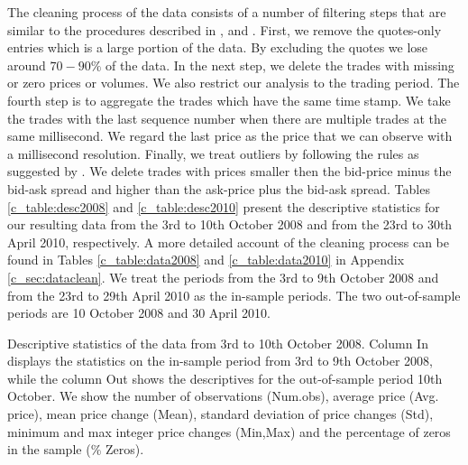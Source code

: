 \documentclass[12pt]{article}
\begin{document}
The cleaning process of the data consists of a number of filtering steps that are
similar to the procedures described in \citet{BoudtCornelissenPayseur},
\citet{BNHansenLundeShephard2008} and  \citet{BrownleesGallo2006}.
First, we remove the quotes-only entries which is a large portion of the data.
By excluding the quotes we lose around $70-90\%$ of the data.
In the next step, we delete the trades with missing or zero prices or volumes.
We also restrict our analysis to the trading period.
The fourth step is to aggregate the trades which have
the same time stamp. We take the trades with the last
sequence number when there are multiple trades at the same millisecond.
We regard the last price as the price that
we can observe with a millisecond resolution.
Finally, we treat outliers by following the rules as suggested by
\citet{BNHansenLundeShephard2008}.
We delete trades with prices smaller then the bid-price minus the bid-ask spread
and higher than the ask-price plus the bid-ask spread. 
Tables \ref{c_table:desc2008} and \ref{c_table:desc2010}
present the descriptive statistics for our resulting data from
the 3rd to 10th October 2008 and from the 23rd to 30th April 2010, respectively.
A more detailed account of the cleaning process can be found in
Tables \ref{c_table:data2008} and \ref{c_table:data2010} in Appendix \ref{c_sec:dataclean}.
We treat the periods from the 3rd to 9th October 2008 and from the 23rd to 29th April 2010 as
the in-sample periods. The two out-of-sample periods are 10 October 2008 and 30 April 2010.

\begin{table}[!htp]
\begin{center}
\caption{Descriptive statistics of the data from 3rd to 10th October 2008. Column In displays the statistics on the in-sample period from 3rd to 9th October 2008, while the column Out shows the descriptives for the out-of-sample period 10th October. We show the number of observations (Num.obs), average price (Avg. price), mean price change (Mean), standard deviation of price changes (Std), minimum and max integer price changes (Min,Max) and the percentage of zeros in the sample ($\%$ Zeros).} 
\begin{small}

\end{small}
\label{c_table:desc2008}
\end{center}
\end{table}
\end{document}
